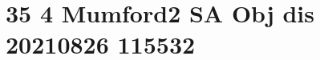 \documentclass[crop=false]{standalone}
\begin{document}

\section{35 4 Mumford2 SA Obj dis 20210826 115532}
\end{document}
